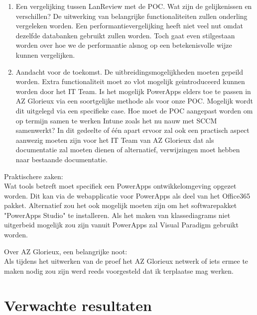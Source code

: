\begin{enumerate}
    \item Een vergelijking tussen LanReview met de POC. Wat zijn de gelijkenissen en verschillen? De uitwerking van belangrijke functionaliteiten zullen onderling vergeleken worden. Een performantievergelijking heeft niet veel nut omdat dezelfde databanken gebruikt zullen worden. Toch gaat even stilgestaan worden over hoe we de performantie alsnog op een betekenisvolle wijze kunnen vergelijken.
    \item Aandacht voor de toekomst. De uitbreidingsmogelijkheden moeten gepeild worden. Extra functionaliteit moet zo vlot mogelijk geintroduceerd kunnen worden door het IT Team. Is het mogelijk PowerApps elders toe te passen in AZ Glorieux via een soortgelijke methode als voor onze POC. Mogelijk wordt dit uitgelegd via een specifieke case. Hoe moet de POC aangepast worden om op termijn samen te werken Intune zoals het nu nauw met SCCM samenwerkt? In dit gedeelte of één apart ervoor zal ook een practisch aspect aanwezig moeten zijn voor het IT Team van AZ Glorieux dat als documentatie zal moeten dienen of alternatief, verwijzingen moet hebben naar bestaande documentatie.
\end{enumerate}


\vspace{5mm}

Praktischere zaken:\\
Wat tools betreft moet specifiek een PowerApps ontwikkelomgeving opgezet worden. Dit kan via de webapplicatie voor PowerApps als deel van het Office365 pakket. Alternatief zou het ook mogelijk moeten zijn om het softwarepakket "PowerApps Studio" te installeren. Als het maken van klassediagrams niet uitgerbeid mogelijk zou zijn vanuit PowerApps zal Visual Paradigm gebruikt worden. 

Over AZ Glorieux, een belangrijke noot:\\
Als tijdens het uitwerken van de proef het AZ Glorieux netwerk of iets ermee te maken nodig zou zijn werd reeds voorgesteld dat ik terplaatse mag werken.

\section{Verwachte resultaten}
\label{sec:verwachte_resultaten}

